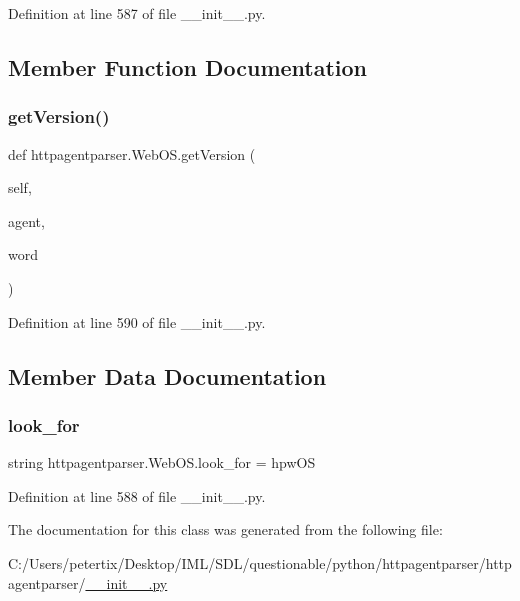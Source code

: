 Definition at line 587 of file \+\_\+\+\_\+init\+\_\+\+\_\+.\+py.



\subsection{Member Function Documentation}
\hypertarget{classhttpagentparser_1_1_web_o_s_a197ac4bbd116ff846b807b731c573b95}{}\label{classhttpagentparser_1_1_web_o_s_a197ac4bbd116ff846b807b731c573b95} 
\subsubsection{\texorpdfstring{get\+Version()}{getVersion()}}
{\footnotesize\ttfamily def httpagentparser.\+Web\+O\+S.\+get\+Version (\begin{DoxyParamCaption}\item[{}]{self,  }\item[{}]{agent,  }\item[{}]{word }\end{DoxyParamCaption})}



Definition at line 590 of file \+\_\+\+\_\+init\+\_\+\+\_\+.\+py.



\subsection{Member Data Documentation}
\hypertarget{classhttpagentparser_1_1_web_o_s_a5f837e1a8362d78c95518881cbd35d74}{}\label{classhttpagentparser_1_1_web_o_s_a5f837e1a8362d78c95518881cbd35d74} 
\subsubsection{\texorpdfstring{look\+\_\+for}{look\_for}}
{\footnotesize\ttfamily string httpagentparser.\+Web\+O\+S.\+look\+\_\+for = \textquotesingle{}hpw\+OS\textquotesingle{}\hspace{0.3cm}{\ttfamily [static]}}



Definition at line 588 of file \+\_\+\+\_\+init\+\_\+\+\_\+.\+py.



The documentation for this class was generated from the following file\+:\begin{DoxyCompactItemize}
\item 
C\+:/\+Users/petertix/\+Desktop/\+I\+M\+L/\+S\+D\+L/questionable/python/httpagentparser/httpagentparser/\hyperlink{____init_____8py}{\+\_\+\+\_\+init\+\_\+\+\_\+.\+py}\end{DoxyCompactItemize}
